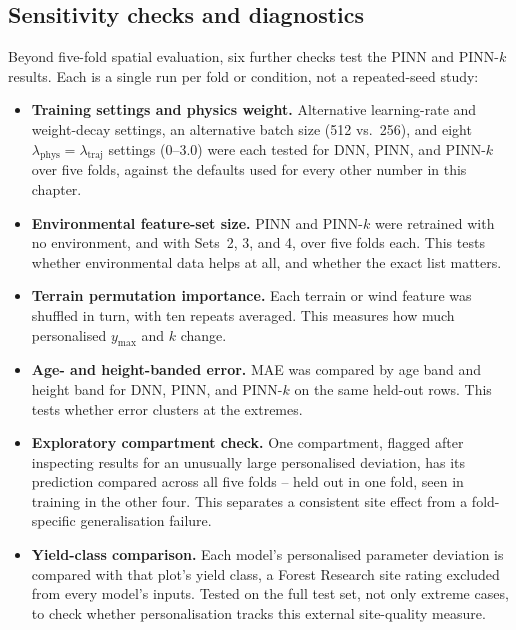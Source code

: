 \subsection*{Sensitivity checks and diagnostics}
Beyond five-fold spatial evaluation, six further checks test the PINN and PINN-$k$ results. Each is a single run per fold or condition, not a repeated-seed study:
\begin{itemize}
\setlength\itemsep{0pt}
\item \textbf{Training settings and physics weight.} Alternative learning-rate and weight-decay settings, an alternative batch size (512 vs.\ 256), and eight $\lambda_{\mathrm{phys}}=\lambda_{\mathrm{traj}}$ settings (0--3.0) were each tested for DNN, PINN, and PINN-$k$ over five folds, against the defaults used for every other number in this chapter.
\item \textbf{Environmental feature-set size.} PINN and PINN-$k$ were retrained with no environment, and with Sets~2, 3, and 4, over five folds each. This tests whether environmental data helps at all, and whether the exact list matters.
\item \textbf{Terrain permutation importance.} Each terrain or wind feature was shuffled in turn, with ten repeats averaged. This measures how much personalised $y_{\max}$ and $k$ change.
\item \textbf{Age- and height-banded error.} MAE was compared by age band and height band for DNN, PINN, and PINN-$k$ on the same held-out rows. This tests whether error clusters at the extremes.
\item \textbf{Exploratory compartment check.} One compartment, flagged after inspecting results for an unusually large personalised deviation, has its prediction compared across all five folds -- held out in one fold, seen in training in the other four. This separates a consistent site effect from a fold-specific generalisation failure.
\item \textbf{Yield-class comparison.} Each model's personalised parameter deviation is compared with that plot's yield class, a Forest Research site rating excluded from every model's inputs. Tested on the full test set, not only extreme cases, to check whether personalisation tracks this external site-quality measure.
\end{itemize}

